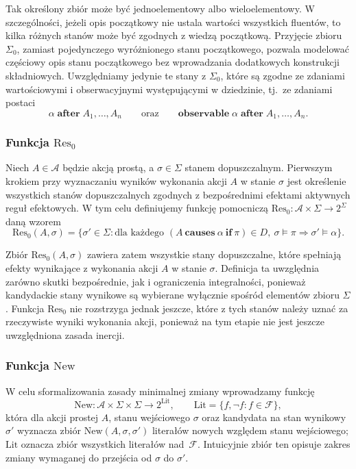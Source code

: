\documentclass[11pt,a4paper]{article}
\theoremstyle{definition}
\begin{document}
Tak określony zbiór może być jednoelementowy albo wieloelementowy. W szczególności, jeżeli opis początkowy nie ustala wartości wszystkich fluentów, to kilka różnych stanów może być zgodnych z wiedzą początkową. Przyjęcie zbioru $\Sigma_0$, zamiast pojedynczego wyróżnionego stanu początkowego, pozwala modelować częściowy opis stanu początkowego bez wprowadzania dodatkowych konstrukcji składniowych. Uwzględniamy jedynie te stany z $\Sigma_0$, które są zgodne ze zdaniami wartościowymi i obserwacyjnymi występującymi w dziedzinie, tj.\ ze zdaniami postaci
\[
\alpha \;\textbf{after}\; A_1,\dots,A_n
\qquad\text{oraz}\qquad
\textbf{observable}\; \alpha \;\textbf{after}\; A_1,\dots,A_n.
\]

\subsubsection{Funkcja \texorpdfstring{$\mathrm{Res}_0$}{Res0}}

Niech $A \in \mathcal{A}$ będzie akcją prostą, a $\sigma \in \Sigma$ stanem dopuszczalnym. Pierwszym krokiem przy wyznaczaniu wyników wykonania akcji $A$ w stanie $\sigma$ jest określenie wszystkich stanów dopuszczalnych zgodnych z bezpośrednimi efektami aktywnych reguł efektowych. W tym celu definiujemy funkcję pomocniczą $\mathrm{Res}_0 : \mathcal{A} \times \Sigma \to 2^{\Sigma}$ daną wzorem
\[
\mathrm{Res}_0(A,\sigma)=
\{\sigma' \in \Sigma :
\text{dla każdego } (A\ \textbf{causes}\ \alpha\ \textbf{if}\ \pi)\in D,\ 
\sigma \models \pi \Rightarrow \sigma' \models \alpha\}.
\]

Zbiór $\mathrm{Res}_0(A,\sigma)$ zawiera zatem wszystkie stany dopuszczalne, które spełniają efekty wynikające z wykonania akcji $A$ w stanie $\sigma$. Definicja ta uwzględnia zarówno skutki bezpośrednie, jak i ograniczenia integralności, ponieważ kandydackie stany wynikowe są wybierane wyłącznie spośród elementów zbioru $\Sigma$. Funkcja $\mathrm{Res}_0$ nie rozstrzyga jednak jeszcze, które z tych stanów należy uznać za rzeczywiste wyniki wykonania akcji, ponieważ na tym etapie nie jest jeszcze uwzględniona zasada inercji.

\subsubsection{Funkcja \texorpdfstring{$\mathrm{New}$}{New}}

W celu sformalizowania zasady minimalnej zmiany wprowadzamy funkcję
\[
\mathrm{New} : \mathcal{A} \times \Sigma \times \Sigma \to 2^{\mathrm{Lit}},
\qquad \mathrm{Lit} = \{f, \neg f : f \in \mathcal{F}\},
\]
która dla akcji prostej $A$, stanu wejściowego $\sigma$ oraz kandydata na stan wynikowy $\sigma'$ wyznacza zbiór $\mathrm{New}(A,\sigma,\sigma')$ literałów nowych względem stanu wejściowego; $\mathrm{Lit}$ oznacza zbiór wszystkich literałów nad~$\mathcal{F}$. Intuicyjnie zbiór ten opisuje zakres zmiany wymaganej do przejścia od $\sigma$ do $\sigma'$.
\end{document}
